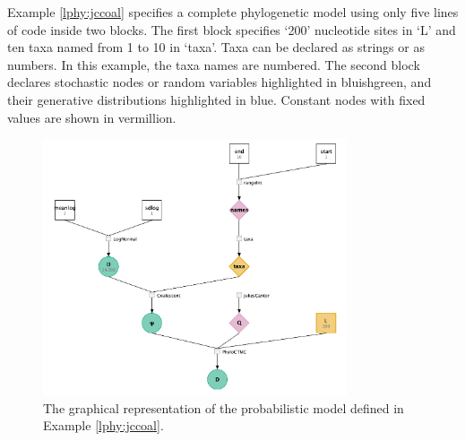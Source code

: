 \documentclass[10pt,letterpaper,table]{article}
\theoremstyle{definition}
\begin{document}
\medskip{}

Example \ref{lphy:jccoal} specifies a complete phylogenetic model using only five lines of code inside two blocks. 
The first block specifies `200' nucleotide sites in `L' and ten taxa named from 1 to 10 in `taxa'. 
Taxa can be declared as strings or as numbers. 
In this example, the taxa names are numbered. 
The second block declares stochastic nodes or random variables highlighted in bluishgreen, and their generative distributions highlighted in blue. 
Constant nodes with fixed values are shown in vermillion.  


\begin{figure}
   \includegraphics[width=0.8\textwidth]{figs_plos/jc.png}
  \caption{The graphical representation of the probabilistic model defined in Example \ref{lphy:jccoal}.} 
  \label{fig:jccoalPGM}
\end{figure}



\end{document}
